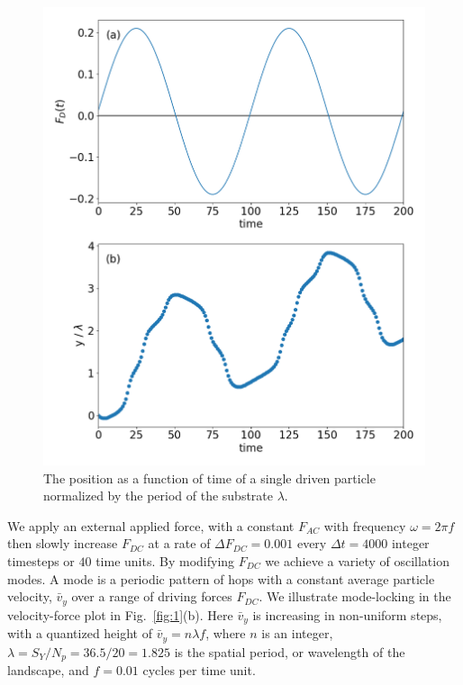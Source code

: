 \documentclass[prb,preprint]{revtex4}
\begin{document}
\begin{center}
\begin{figure}[h!]
\centering
\includegraphics[scale=.25]{position}
\caption{The position as a function of time of a single driven particle
  normalized by the period of the substrate $\lambda$.
  }
\label{fig:0}
\end{figure}
\end{center}


We apply an external applied force, 
with 
a constant $F_{AC}$ with frequency $\omega = 2\pi f$
then slowly increase $F_{DC}$
at a rate of $\Delta F_{DC} = 0.001$ every $\Delta t = 4000$ integer timesteps
or $40$ time units.
By modifying $F_{DC}$ we 
achieve a variety of oscillation modes.
A mode is a periodic pattern of hops
with a constant average particle velocity, $\bar{v}_{y}$
over a range of driving forces $F_{DC}$.
We illustrate mode-locking in 
the velocity-force plot in Fig.~\ref{fig:1}(b).
Here $\bar{v}_{y}$ is increasing in non-uniform steps,
with a quantized height of
$\bar{v}_{y} = n \lambda f$,
where $n$ is an integer,
$\lambda = S_Y/N_p = 36.5/20 = 1.825$ is the spatial period, or wavelength
of the landscape,
and $f = 0.01$ cycles per time unit.
\end{document}
